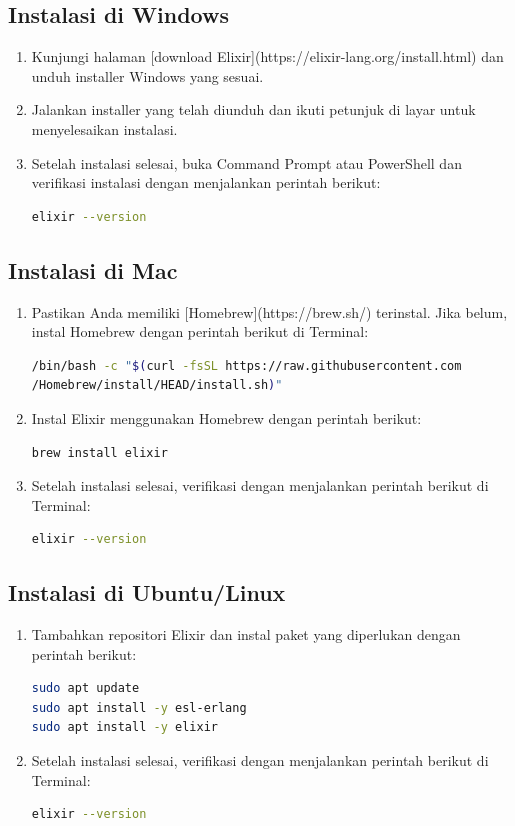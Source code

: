 \subsection{Instalasi di Windows}

\begin{enumerate}
\item Kunjungi halaman [download Elixir](https://elixir-lang.org/install.html) dan unduh installer Windows yang sesuai.
\item Jalankan installer yang telah diunduh dan ikuti petunjuk di layar untuk menyelesaikan instalasi.
\item Setelah instalasi selesai, buka Command Prompt atau PowerShell dan verifikasi instalasi dengan menjalankan perintah berikut:
\begin{lstlisting}[language=bash]
	elixir --version
\end{lstlisting}
\end{enumerate}

\subsection{Instalasi di Mac}

\begin{enumerate}
\item Pastikan Anda memiliki [Homebrew](https://brew.sh/) terinstal. Jika belum, instal Homebrew dengan perintah berikut di Terminal:
\begin{lstlisting}[language=bash]
/bin/bash -c "$(curl -fsSL https://raw.githubusercontent.com
/Homebrew/install/HEAD/install.sh)"
\end{lstlisting}
\item Instal Elixir menggunakan Homebrew dengan perintah berikut:
\begin{lstlisting}[language=bash]
brew install elixir
\end{lstlisting}
\item Setelah instalasi selesai, verifikasi dengan menjalankan perintah berikut di Terminal:
\begin{lstlisting}[language=bash]
elixir --version
\end{lstlisting}
\end{enumerate}

\subsection{Instalasi di Ubuntu/Linux}

\begin{enumerate}
\item Tambahkan repositori Elixir dan instal paket yang diperlukan dengan perintah berikut:
\begin{lstlisting}[language=bash]
sudo apt update
sudo apt install -y esl-erlang
sudo apt install -y elixir
\end{lstlisting}
\item Setelah instalasi selesai, verifikasi dengan menjalankan perintah berikut di Terminal:
\begin{lstlisting}[language=bash]
elixir --version
\end{lstlisting}
\end{enumerate}


